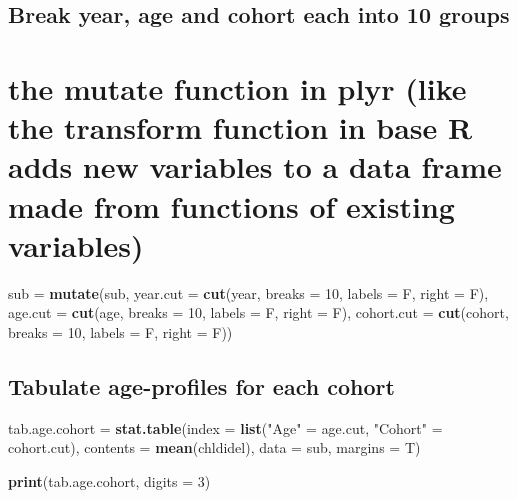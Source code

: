 \documentclass[]{article}
\newenvironment{Shaded}{\begin{snugshade}}{\end{snugshade}}
\newcommand{\DataTypeTok}[1]{\textcolor[rgb]{0.13,0.29,0.53}{#1}}
\newcommand{\DecValTok}[1]{\textcolor[rgb]{0.00,0.00,0.81}{#1}}
\newcommand{\KeywordTok}[1]{\textcolor[rgb]{0.13,0.29,0.53}{\textbf{#1}}}
\newcommand{\NormalTok}[1]{#1}
\newcommand{\StringTok}[1]{\textcolor[rgb]{0.31,0.60,0.02}{#1}}
\begin{document}
\hypertarget{break-year-age-and-cohort-each-into-10-groups}{%
\subsection{Break year, age and cohort each into 10
groups}\label{break-year-age-and-cohort-each-into-10-groups}}

\hypertarget{the-mutate-function-in-plyr-like-the-transform-function-in-base-r-adds-new-variables-to-a-data-frame-made-from-functions-of-existing-variables}{%
\section{the mutate function in plyr (like the transform function in
base R adds new variables to a data frame made from functions of
existing
variables)}\label{the-mutate-function-in-plyr-like-the-transform-function-in-base-r-adds-new-variables-to-a-data-frame-made-from-functions-of-existing-variables}}

\begin{Shaded}
\begin{Highlighting}[]
\NormalTok{sub =}\StringTok{ }\KeywordTok{mutate}\NormalTok{(sub, }
             \DataTypeTok{year.cut =} \KeywordTok{cut}\NormalTok{(year, }\DataTypeTok{breaks =} \DecValTok{10}\NormalTok{, }\DataTypeTok{labels =}\NormalTok{ F, }\DataTypeTok{right =}\NormalTok{ F),}
             \DataTypeTok{age.cut =} \KeywordTok{cut}\NormalTok{(age, }\DataTypeTok{breaks =} \DecValTok{10}\NormalTok{, }\DataTypeTok{labels =}\NormalTok{ F, }\DataTypeTok{right =}\NormalTok{ F),}
             \DataTypeTok{cohort.cut =} \KeywordTok{cut}\NormalTok{(cohort, }\DataTypeTok{breaks =} \DecValTok{10}\NormalTok{, }\DataTypeTok{labels =}\NormalTok{ F, }\DataTypeTok{right =}\NormalTok{ F))}
\end{Highlighting}
\end{Shaded}

\hypertarget{tabulate-age-profiles-for-each-cohort}{%
\subsection{Tabulate age-profiles for each
cohort}\label{tabulate-age-profiles-for-each-cohort}}

\begin{Shaded}
\begin{Highlighting}[]
\NormalTok{tab.age.cohort =}\StringTok{ }\KeywordTok{stat.table}\NormalTok{(}\DataTypeTok{index =} \KeywordTok{list}\NormalTok{(}\StringTok{"Age"}\NormalTok{ =}\StringTok{ }\NormalTok{age.cut, }\StringTok{"Cohort"}\NormalTok{ =}\StringTok{ }\NormalTok{cohort.cut),}
                        \DataTypeTok{contents =} \KeywordTok{mean}\NormalTok{(chldidel),}
                        \DataTypeTok{data =}\NormalTok{ sub,}
                        \DataTypeTok{margins =}\NormalTok{ T)}


\KeywordTok{print}\NormalTok{(tab.age.cohort, }\DataTypeTok{digits =} \DecValTok{3}\NormalTok{)}
\end{Highlighting}
\end{Shaded}
\end{document}
